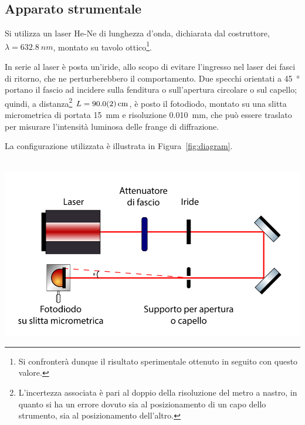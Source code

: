 \documentclass[10pt,oneside,a4paper]{article}
\newenvironment{Figure}
  {\par\medskip\noindent\minipage{\linewidth}}
  {\endminipage\par\medskip}
\begin{document}
\begin{multicols}{2}
\section{Apparato strumentale}

Si utilizza un laser He-Ne di lunghezza d'onda, dichiarata dal costruttore, $\lambda = \SI{632.8}{nm}$, montato su tavolo ottico\footnote{Si confronterà dunque il risultato sperimentale ottenuto in seguito con questo valore.}. 

In serie al laser è posta un'iride, allo scopo di evitare l'ingresso nel laser dei fasci di ritorno, che ne perturberebbero il comportamento. Due specchi orientati a \SI{45}{\degree} portano il fascio ad incidere sulla fenditura o sull'apertura circolare o sul capello; quindi, a distanza\footnote{L'incertezza associata è pari al doppio della risoluzione del metro a nastro, in quanto si ha un errore dovuto sia al posizionamento di un capo dello strumento, sia al posizionamento dell'altro.} $L = \SI{90.0 \pm 0.2}{cm}$, è posto il fotodiodo, montato su una slitta micrometrica di portata \SI{15}{mm} e risoluzione \SI{0.010}{mm}, che può essere traslato per misurare l'intensità luminosa delle frange di diffrazione.

La configurazione utilizzata è illustrata in Figura~\ref{fig:diagram}.

\begin{Figure}
	\begin{center}
	\hbox{\hspace{-0.8cm}
	\includegraphics[width=1.1\linewidth]{diagram.png}}
	\label{fig:diagram}
	\end{center}
\end{Figure}


\end{multicols}
\end{document}
